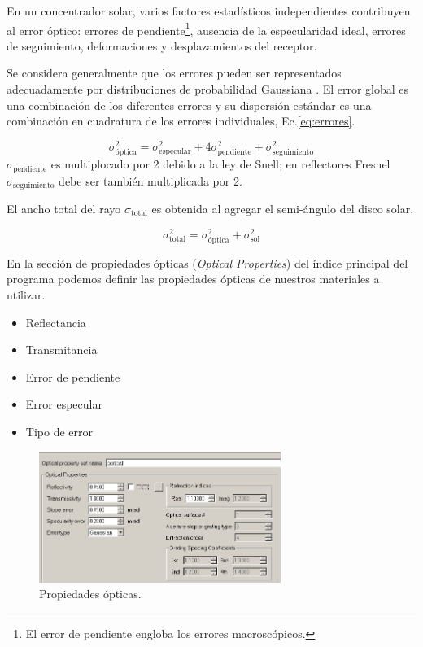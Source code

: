 \documentclass[12pt, spanish]{article}
\theoremstyle{problemstyle}
\begin{document}
En un concentrador solar, varios factores estadísticos independientes contribuyen al error óptico: errores de pendiente\footnote{El error de pendiente engloba los errores macroscópicos.}, ausencia de la especularidad ideal, errores de seguimiento, deformaciones y desplazamientos del receptor.

Se considera generalmente que los errores pueden ser representados adecuadamente por distribuciones de probabilidad Gaussiana \citep{Pettit1977characterization}. El error global es una combinación de los diferentes errores y su dispersión estándar es una combinación en cuadratura de los errores individuales, Ec.\ref{eq:errores}.

\begin{equation}
  \label{eq:errores}
  \sigma_{\text{\'optica}}^2 = \sigma_{\text{especular}}^2 + 4\sigma_{\text{pendiente}}^2 + \sigma_{\text{seguimiento}}^2
\end{equation}
$\sigma_{\text{pendiente}}$ es multiplocado por 2 debido a la ley de Snell; en reflectores Fresnel $\sigma_{\text{seguimiento}}$ debe ser también multiplicada por 2.

El ancho total del rayo $\sigma_{\text{total}}$ es obtenida al agregar el semi-ángulo del disco solar.

\begin{equation}
  \label{eq:total}
  \sigma_{\text{total}}^2 = \sigma_{\text{\'optica}}^2 + \sigma_{\text{sol}}^2
\end{equation}

En la sección de propiedades ópticas (\emph{Optical Properties}) del índice principal del programa podemos definir las propiedades ópticas de nuestros materiales a utilizar.

\begin{itemize}[noitemsep]
\item Reflectancia
\item Transmitancia
\item Error de pendiente
\item Error especular
\item Tipo de error
\end{itemize}

\begin{figure}[h!]
  \centering
  \includegraphics[width=0.7\textwidth]{figures/optica}
  \caption{\label{fig:optica} Propiedades ópticas.}
\end{figure}
\end{document}
